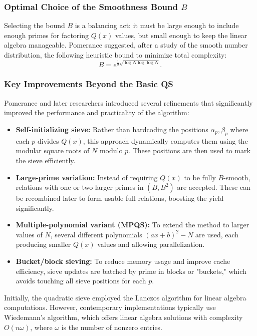 \documentclass[a4paper, 11pt]{article}
\begin{document}
\subsubsection{Optimal Choice of the Smoothness Bound $B$}

Selecting the bound $B$ is a balancing act: it must be large enough to include enough primes for factoring $Q(x)$ values, but small enough to keep the linear algebra manageable. Pomerance suggested, after a study of the smooth number distribution, the following heuristic bound to minimize total complexity:
\begin{equation}
B = e^{\frac{1}{2} \sqrt{\log N \log \log N}}.
\end{equation}

\subsubsection{Key Improvements Beyond the Basic QS}

Pomerance and later researchers introduced several refinements that significantly improved the performance and practicality of the algorithm:
\begin{itemize}
\item \textbf{Self-initializing sieve:} Rather than hardcoding the positions $\alpha_p, \beta_p$ where each $p$ divides $Q(x)$, this approach dynamically computes them using the modular square roots of $N$ modulo $p$. These positions are then used to mark the sieve efficiently.
\item \textbf{Large-prime variation:} Instead of requiring $Q(x)$ to be fully $B$-smooth, relations with one or two larger primes in $(B, B^2)$ are accepted. These can be recombined later to form usable full relations, boosting the yield significantly.
\item \textbf{Multiple-polynomial variant (MPQS):} To extend the method to larger values of $N$, several different polynomials $(ax + b)^2 - N$ are used, each producing smaller $Q(x)$ values and allowing parallelization.
\item \textbf{Bucket/block sieving:} To reduce memory usage and improve cache efficiency, sieve updates are batched by prime in blocks or "buckets," which avoids touching all sieve positions for each $p$.
\end{itemize}

Initially, the quadratic sieve employed the Lanczos algorithm for linear algebra computations. However, contemporary implementations typically use Wiedemann's algorithm, which offers linear algebra solutions with complexity $O(n\omega)$, where $\omega$ is the number of nonzero entries.
\end{document}
